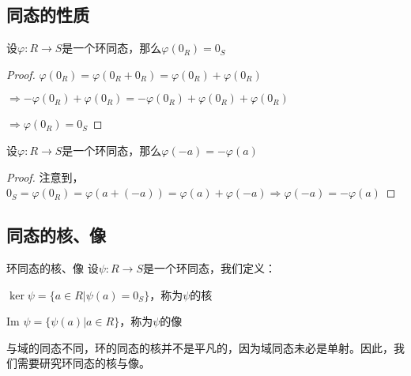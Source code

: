 \documentclass[12pt, a4paper, oneside, UTF8]{ctexbook}
\begin{document}
		\subsection{同态的性质}
		\begin{para}{0}
				\begin{proposition}
					设$\varphi : R \rightarrow S$是一个环同态，那么$\varphi (0_R) = 0_S$
				\end{proposition}
				\begin{proof}
					$\varphi (0_R) = \varphi (0_R + 0_R) = \varphi (0_R) + \varphi (0_R)$

					$\Rightarrow -\varphi (0_R)+\varphi (0_R) = -\varphi (0_R)+\varphi (0_R)+\varphi (0_R)$

					$\Rightarrow \varphi (0_R)=0_S$
				\end{proof}
				\begin{proposition}
					设$\varphi : R \rightarrow S$是一个环同态，那么$\varphi (-a) = -\varphi (a)$
				\end{proposition}
				\begin{proof}
					注意到，$0_S = \varphi (0_R) = \varphi (a + (-a)) = \varphi (a) + \varphi (-a) \Rightarrow \varphi (-a)=-\varphi (a)$
				\end{proof}
		\end{para}
		\subsection{同态的核、像}
			\begin{defn}{环同态的核、像}{}
				设$\psi : R \rightarrow S$是一个环同态，我们定义：

				$\ker \psi = \{a \in R | \psi (a) = 0_S\}$，称为$\psi $的核

				$\text{Im } \psi = \{\psi (a) | a \in R\}$，称为$\psi $的像
			\end{defn}
			与域的同态不同，环的同态的核并不是平凡的，因为域同态未必是单射。因此，我们需要研究环同态的核与像。
\end{document}
